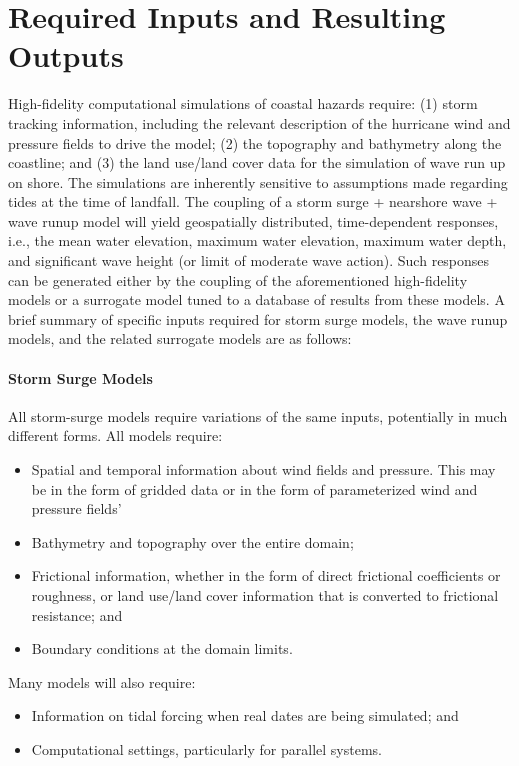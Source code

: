 \section{Required Inputs and Resulting Outputs}
\label{sec:storm_surge_io}

High-fidelity computational simulations of coastal hazards require: (1) storm tracking information, including the relevant description of the hurricane wind and pressure fields to drive the model; (2) the topography and bathymetry along the coastline; and (3) the land use/land cover data for the simulation of wave run up on shore. The simulations are inherently sensitive to assumptions made regarding tides at the time of landfall. The coupling of a storm surge + nearshore wave + wave runup model will yield geospatially distributed, time-dependent responses, i.e., the mean water elevation, maximum water elevation, maximum water depth, and significant wave height (or limit of moderate wave action). Such responses can be generated either by the coupling of the aforementioned high-fidelity models or a surrogate model tuned to a database of results from these models. A brief summary of specific inputs required for storm surge models, the wave runup models, and the related surrogate models are as follows:

\paragraph{Storm Surge Models} All storm-surge models require variations of the same inputs, potentially in much different forms. All models require:

\begin{itemize}
    \item Spatial and temporal information about wind fields and pressure. This may be in the form of gridded data or in the form of parameterized wind and pressure fields'
    \item Bathymetry and topography over the entire domain;
    \item Frictional information, whether in the form of direct frictional coefficients or roughness, or land use/land cover information that is converted to frictional resistance; and 
    \item Boundary conditions at the domain limits.
\end{itemize}

\noindent
Many models will also require:

\begin{itemize}
    \item Information on tidal forcing when real dates are being simulated; and
    \item Computational settings, particularly for parallel systems.
\end{itemize}

